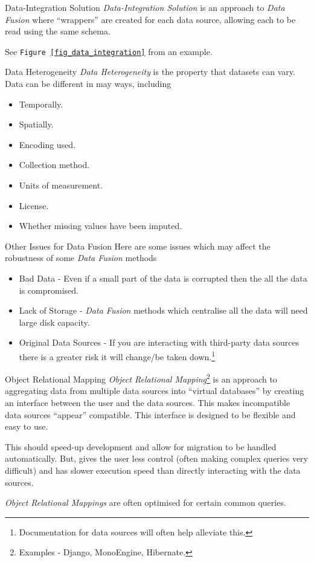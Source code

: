 \documentclass[11pt,a4paper]{article}
\begin{document}
  \begin{proposition}{Data-Integration Solution}
    \textit{Data-Integration Solution} is an approach to \textit{Data Fusion} where ``wrappers'' are created for each data source, allowing each to be read using the same schema.
    \par See \texttt{Figure \ref{fig_data_integration}} from an example.
  \end{proposition}

  \begin{definition}{Data Heterogeneity}
    \textit{Data Heterogeneity} is the property that datasets can vary. Data can be different in may ways, including
    \begin{itemize}
      \item Temporally.
      \item Spatially.
      \item Encoding used.
      \item Collection method.
      \item Units of measurement.
      \item License.
      \item Whether missing values have been imputed.
    \end{itemize}
  \end{definition}

  \begin{remark}{Other Issues for Data Fusion}
    Here are some issues which may affect the robustness of some \textit{Data Fusion} methods
    \begin{itemize}
      \item Bad Data - Even if a small part of the data is corrupted then the all the data is compromised.
      \item Lack of Storage - \textit{Data Fusion} methods which centralise all the data will need large disk capacity.
      \item Original Data Sources - If you are interacting with third-party data sources there is a greater risk it will change/be taken down.\footnote{Documentation for data sources will often help alleviate this.}
    \end{itemize}
  \end{remark}

  \begin{definition}{Object Relational Mapping}
    \textit{Object Relational Mapping}\footnote{Examples - Django, MonoEngine, Hibernate.} is an approach to aggregating data from multiple data sources into ``virtual databases'' by creating an interface between the user and the data sources. This makes incompatible data sources ``appear'' compatible. This interface is designed to be flexible and easy to use.
    \par This should speed-up development and allow for migration to be handled automatically. But, gives the user less control (often making complex queries very difficult) and has slower execution speed than directly interacting with the data sources.
    \par \textit{Object Relational Mappings} are often optimised for certain common queries.
  \end{definition}
\end{document}
